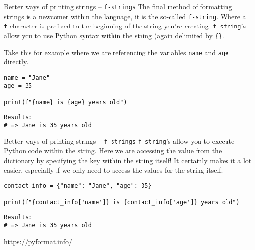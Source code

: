 \documentclass[10pt]{beamer}
\begin{document}
\begin{frame}[label={sec:org160bdfc},fragile]{Better ways of printing strings -- \texttt{f-strings}}
 The final method of formatting strings is a newcomer within the language, it is the
so-called \texttt{f-string}. Where a \texttt{f} character is prefixed to the beginning of the string
you're creating. \texttt{f-string}'s allow you to use Python syntax within the string (again
delimited by \texttt{\{\}}.

Take this for example where we are referencing the variables \texttt{name} and \texttt{age} directly.

\begin{verbatim}
name = "Jane"
age = 35

print(f"{name} is {age} years old")
\end{verbatim}

\begin{verbatim}
Results: 
# => Jane is 35 years old
\end{verbatim}
\end{frame}

\begin{frame}[label={sec:org4e7453a},fragile]{Better ways of printing strings -- \texttt{f-strings}}
 \texttt{f-string}'s allow you to execute Python code within the string. Here we are accessing
the value from the dictionary by specifying the key within the string itself! It
certainly makes it a lot easier, especially if we only need to access the values for
the string itself.

\begin{verbatim}
contact_info = {"name": "Jane", "age": 35}

print(f"{contact_info['name']} is {contact_info['age']} years old")
\end{verbatim}

\begin{verbatim}
Results: 
# => Jane is 35 years old
\end{verbatim}


\url{https://pyformat.info/}
\end{frame}
\end{document}
